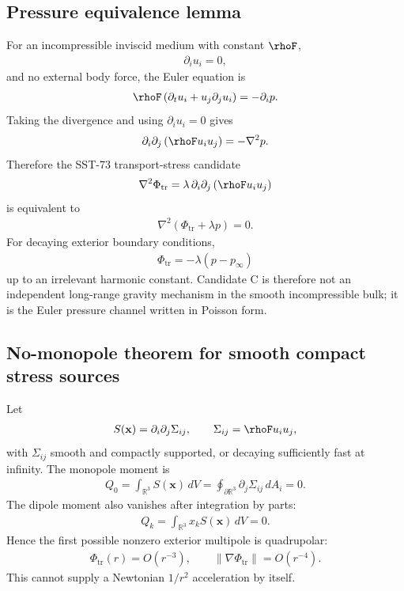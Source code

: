\subsection{Pressure equivalence lemma}
For an incompressible inviscid medium with constant \(\rhoF\),
\begin{align}
    \partial_i u_i=0,
\end{align}
and no external body force, the Euler equation is
\begin{align}
    \rhoF\left(\partial_t u_i + u_j\partial_j u_i\right)
    =
    -\partial_i p .
\end{align}
Taking the divergence and using \(\partial_i u_i=0\) gives
\begin{align}
    \partial_i\partial_j\left(\rhoF u_i u_j\right)
    =
    -\nabla^2p .
    \label{eq:rt_pressure_equivalence_euler_identity}
\end{align}
Therefore the SST-73 transport-stress candidate
\begin{align}
    \nabla^2\Phi_{\mathrm{tr}}
    =
    \lambda\,\partial_i\partial_j\left(\rhoF u_i u_j\right)
\end{align}
is equivalent to
\begin{align}
    \nabla^2\left(\Phi_{\mathrm{tr}}+\lambda p\right)=0 .
\end{align}
For decaying exterior boundary conditions,
\begin{align}
    \boxed{
    \Phi_{\mathrm{tr}}
    =
    -\lambda\left(p-p_\infty\right)
    }
    \label{eq:rt_transport_pressure_equivalence}
\end{align}
up to an irrelevant harmonic constant.  Candidate C is therefore not an
independent long-range gravity mechanism in the smooth incompressible bulk; it
is the Euler pressure channel written in Poisson form.

\subsection{No-monopole theorem for smooth compact stress sources}
Let
\begin{align}
    S(\mathbf{x})
    =
    \partial_i\partial_j\Sigma_{ij},
    \qquad
    \Sigma_{ij}=\rhoF u_i u_j,
\end{align}
with \(\Sigma_{ij}\) smooth and compactly supported, or decaying sufficiently
fast at infinity.  The monopole moment is
\begin{align}
    Q_0
    =
    \int_{\mathbb{R}^3}S(\mathbf{x})\,dV
    =
    \oint_{\partial\mathbb{R}^3}\partial_j\Sigma_{ij}\,dA_i
    =0 .
\end{align}
The dipole moment also vanishes after integration by parts:
\begin{align}
    Q_k
    =
    \int_{\mathbb{R}^3}x_k S(\mathbf{x})\,dV
    =0 .
\end{align}
Hence the first possible nonzero exterior multipole is quadrupolar:
\begin{align}
    \Phi_{\mathrm{tr}}(r)=O(r^{-3}),
    \qquad
    \lVert\nabla\Phi_{\mathrm{tr}}\rVert=O(r^{-4}).
\end{align}
This cannot supply a Newtonian \(1/r^2\) acceleration by itself.

